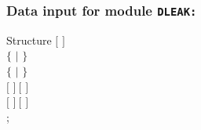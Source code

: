 \vskip 0.2cm

\subsubsection{Data input for module {\tt DLEAK:}}\label{sect:dleak_data}

\begin{DataStructure}{Structure }
$[$   $]$ \\
 $\{$  $|$  $\}$ \\
 $\{$  $|$  $\}$ \\
$[$   $]~[$   $]$\\
$[$   $]~[$   $]$\\
;
\end{DataStructure}

